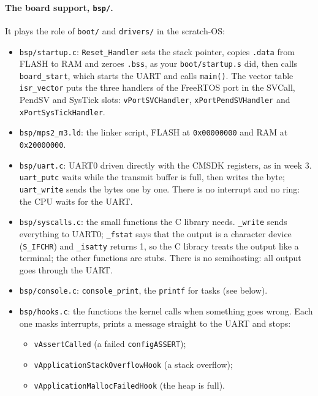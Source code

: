 \paragraph{The board support, \texttt{bsp/}.} It plays the role of \texttt{boot/} and \texttt{drivers/} in the scratch-OS:
\begin{itemize}
    \item \texttt{bsp/startup.c}: \texttt{Reset\_Handler} sets the stack pointer, copies \texttt{.data} from FLASH to RAM and zeroes \texttt{.bss}, as your \texttt{boot/startup.s} did, then calls \texttt{board\_start}, which starts the UART and calls \texttt{main()}. The vector table \texttt{isr\_vector} puts the three handlers of the FreeRTOS port in the SVCall, PendSV and SysTick slots: \texttt{vPortSVCHandler}, \texttt{xPortPendSVHandler} and \texttt{xPortSysTickHandler}.
    \item \texttt{bsp/mps2\_m3.ld}: the linker script, FLASH at \texttt{0x00000000} and RAM at \texttt{0x20000000}.
    \item \texttt{bsp/uart.c}: UART0 driven directly with the CMSDK registers, as in week 3. \texttt{uart\_putc} waits while the transmit buffer is full, then writes the byte; \texttt{uart\_write} sends the bytes one by one. There is no interrupt and no ring: the CPU waits for the UART.
    \item \texttt{bsp/syscalls.c}: the small functions the C library needs. \texttt{\_write} sends everything to UART0; \texttt{\_fstat} says that the output is a character device (\texttt{S\_IFCHR}) and \texttt{\_isatty} returns 1, so the C library treats the output like a terminal; the other functions are stubs. There is no semihosting: all output goes through the UART.
    \item \texttt{bsp/console.c}: \texttt{console\_print}, the \texttt{printf} for tasks (see below).
    \item \texttt{bsp/hooks.c}: the functions the kernel calls when something goes wrong. Each one masks interrupts, prints a message straight to the UART and stops:
    \begin{itemize}
        \item \texttt{vAssertCalled} (a failed \texttt{configASSERT});
        \item \texttt{vApplicationStackOverflowHook} (a stack overflow);
        \item \texttt{vApplicationMallocFailedHook} (the heap is full).
    \end{itemize}
\end{itemize}

